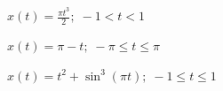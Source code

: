\documentclass[a4paper, 10pt]{article}
\begin{document}
\begin{subproblems}[start=1]
    \item \( x(t) = \frac{\pi t^3}{2};\; -1 < t < 1 \)
\end{subproblems}

\begin{solution}

\end{solution}

\newpage 

\begin{tosubmit}
\begin{subproblems}[start=2]
    \item \( x(t) = \pi - t;\; -\pi \leq t \leq \pi \)
\end{subproblems}

\par\noindent\submitsolution

\end{tosubmit}

\newpage

\begin{tosubmit}
\begin{subproblems}[start=3]
    \item \( x(t) = t^2 + \sin^3(\pi t);\; -1 \leq t \leq 1 \)
\end{subproblems}

\par\noindent\submitsolution

\end{tosubmit}
\end{document}
